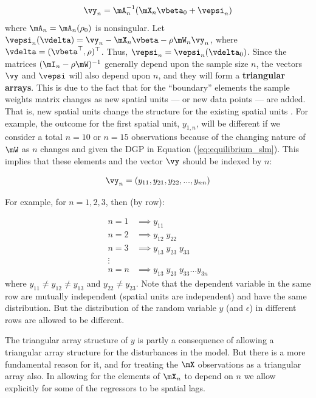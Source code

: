 \begin{equation}\label{eq:equilibrium_slm}
\vy_n = \mA_n^{-1}(\mX_n\vbeta_0 + \vepsi_n)
\end{equation}
%
where $\mA_n = \mA_n(\rho_0)$ is nonsingular. Let $\vepsi_n(\vdelta) = \vy_n - \mX_n\vbeta - \rho \mW_n\vy_n$, where $\vdelta = (\vbeta^\top, \rho)^\top$. Thus, $\vepsi_n = \vepsi_n(\vdelta_0)$. Since the matrices $(\mI_n - \rho\mW)^{-1}$ generally depend upon the sample size $n$, the vectors $\vy$ and $\vepsi$ will also depend upon $n$, and they will form a \textbf{triangular arrays}. This is due to the fact that for the ``boundary'' elements the sample weights matrix changes as new spatial units --- or new data points --- are added. That is, new spatial units change the structure for the existing spatial units \citep[see for example][]{kelejian1999generalized, kelejian2001asymptotic, anselinSpatialEcon}. For example, the outcome for the first spatial unit, $y_{1,n}$, will be different if we consider a total  $n = 10$ or $n = 15$ observations because of the changing nature of $\mW$ as $n$ changes and given the DGP in Equation (\ref{eq:equilibrium_slm}). This implies that these elements and the vector $\vy$ should be indexed by $n$:

\begin{equation*}
  \vy_n = (y_{11}, y_{21}, y_{22},..., y_{nn})
\end{equation*}

For example, for $n = 1, 2, 3$, then (by row):

\begin{equation*}
\begin{aligned}
  n = 1 & \implies y_{11} \;         \\
  n = 2 & \implies y_{12} \; y_{22}  \\
  n = 3 & \implies y_{13} \; y_{23} \; y_{33} \\
  \vdots & \\
  n = n & \implies y_{13} \; y_{23} \; y_{33} \hdots y_{3n}
\end{aligned}
\end{equation*}
%
where $y_{11} \neq y_{12} \neq y_{13}$ and $y_{22}\neq y_{23}$. Note that the dependent variable in the same row are mutually independent (spatial units are independent) and have the same distribution. But the distribution of  the random variable $y$ (and $\epsilon$) in different rows are allowed to be different. 

The triangular array structure of $y$ is partly a consequence of allowing a triangular array structure for the disturbances in the model. But there is a more fundamental reason for it, and for treating the $\mX$ observations as a triangular array also. In allowing for the elements of $\mX_n$ to depend on $n$ we allow explicitly for some of the regressors to be spatial lags.

